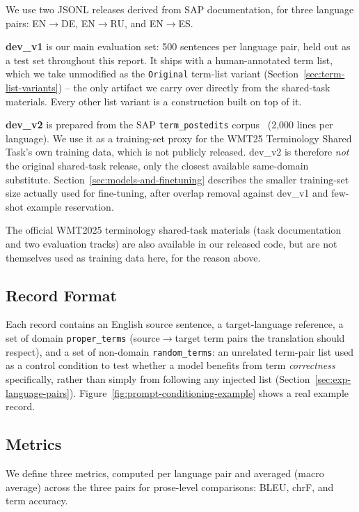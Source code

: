\documentclass[11pt]{article}
\begin{document}
We use two JSONL releases derived from SAP documentation, for three language pairs: EN$\to$DE, EN$\to$RU, and EN$\to$ES.

\textbf{dev\_v1} is our main evaluation set: 500 sentences per language pair, held out as a test set throughout this report. It ships with a human-annotated term list, which we take unmodified as the \texttt{Original} term-list variant (Section~\ref{sec:term-list-variants}) -- the only artifact we carry over directly from the shared-task materials. Every other list variant is a construction built on top of it.

\textbf{dev\_v2} is prepared from the SAP \texttt{term\_postedits} corpus~\citep{sap2024termpostedits} (2{,}000 lines per language). We use it as a training-set proxy for the WMT25 Terminology Shared Task's own training data, which is not publicly released. dev\_v2 is therefore \emph{not} the original shared-task release, only the closest available same-domain substitute. Section~\ref{sec:models-and-finetuning} describes the smaller training-set size actually used for fine-tuning, after overlap removal against dev\_v1 and few-shot example reservation.

The official WMT2025 terminology shared-task materials (task documentation and two evaluation tracks) are also available in our released code, but are not themselves used as training data here, for the reason above.

\subsection{Record Format}
\label{sec:record-format}

Each record contains an English source sentence, a target-language reference, a set of domain \texttt{proper\_terms} (source$\rightarrow$target term pairs the translation should respect), and a set of non-domain \texttt{random\_terms}: an unrelated term-pair list used as a control condition to test whether a model benefits from term \emph{correctness} specifically, rather than simply from following any injected list (Section~\ref{sec:exp-language-pairs}). Figure~\ref{fig:prompt-conditioning-example} shows a real example record.

\subsection{Metrics}
\label{sec:metrics}

We define three metrics, computed per language pair and averaged (macro average) across the three pairs for prose-level comparisons: BLEU, chrF, and term accuracy.
\end{document}
